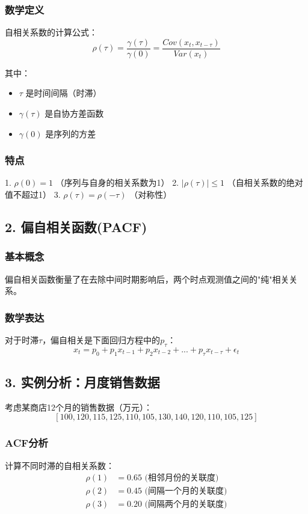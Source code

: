 \subsubsection{数学定义}
自相关系数的计算公式：
$$\rho(\tau) = \frac{\gamma(\tau)}{\gamma(0)} = \frac{Cov(x_t, x_{t-\tau})}{Var(x_t)}$$

其中：
\begin{itemize}
    \item $\tau$ 是时间间隔（时滞）
    \item $\gamma(\tau)$ 是自协方差函数
    \item $\gamma(0)$ 是序列的方差
\end{itemize}

\subsubsection{特点}
1. $\rho(0) = 1$ （序列与自身的相关系数为1）
2. $|\rho(\tau)| \leq 1$ （自相关系数的绝对值不超过1）
3. $\rho(\tau) = \rho(-\tau)$ （对称性）

\subsection{2. 偏自相关函数(PACF)}

\subsubsection{基本概念}
偏自相关函数衡量了在去除中间时期影响后，两个时点观测值之间的"纯"相关关系。

\subsubsection{数学表达}
对于时滞$\tau$，偏自相关是下面回归方程中的$p_{\tau}$：
$$x_t = p_0 + p_1x_{t-1} + p_2x_{t-2} + ... + p_{\tau}x_{t-\tau} + \epsilon_t$$

\subsection{3. 实例分析：月度销售数据}
考虑某商店12个月的销售数据（万元）：
$$[100, 120, 115, 125, 110, 105, 130, 140, 120, 110, 105, 125]$$

\subsubsection{ACF分析}
计算不同时滞的自相关系数：
\begin{align*}
\rho(1) &= 0.65 \text{ (相邻月份的关联度)} \\
\rho(2) &= 0.45 \text{ (间隔一个月的关联度)} \\
\rho(3) &= 0.20 \text{ (间隔两个月的关联度)}
\end{align*}

